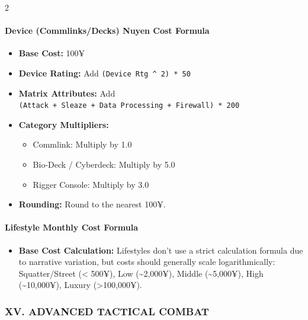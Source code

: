 \documentclass[
  oneside]{article}
\providecommand{\tightlist}{%
  \setlength{\itemsep}{0pt}\setlength{\parskip}{0pt}}
\begin{document}
\begin{multicols}{2}
\hypertarget{device-commlinksdecks-nuyen-cost-formula}{%
\paragraph{Device (Commlinks/Decks) Nuyen Cost
Formula}\label{device-commlinksdecks-nuyen-cost-formula}}

\begin{itemize}
\tightlist
\item
  \textbf{Base Cost:} 100¥
\item
  \textbf{Device Rating:} Add
  \texttt{(Device\ Rtg\ \^{}\ 2)\ *\ 50}
\item
  \textbf{Matrix Attributes:} Add
  \texttt{(Attack\ +\ Sleaze\ +\ Data\ Processing\ +\ Firewall)\ *\ 200}
\item
  \textbf{Category Multipliers:}

  \begin{itemize}
  \tightlist
  \item
    Commlink: Multiply by 1.0
  \item
    Bio-Deck / Cyberdeck: Multiply by 5.0
  \item
    Rigger Console: Multiply by 3.0
  \end{itemize}
\item
  \textbf{Rounding:} Round to the nearest 100¥.
\end{itemize}

\hypertarget{lifestyle-monthly-cost-formula}{%
\paragraph{Lifestyle Monthly Cost
Formula}\label{lifestyle-monthly-cost-formula}}

\begin{itemize}
\tightlist
\item
  \textbf{Base Cost Calculation:} Lifestyles don't
  use a strict calculation formula due to
  narrative variation, but costs should generally
  scale logarithmically: Squatter/Street
  (\textless{} 500¥), Low (\textasciitilde2,000¥),
  Middle (\textasciitilde5,000¥), High
  (\textasciitilde10,000¥), Luxury
  (\textgreater100,000¥).
\end{itemize}

\hypertarget{xv.-advanced-tactical-combat}{%
\subsubsection{XV. ADVANCED TACTICAL
COMBAT}\label{xv.-advanced-tactical-combat}}


\end{multicols}
\end{document}
